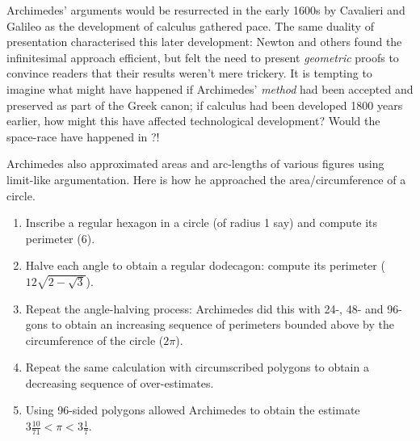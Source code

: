 Archimedes' arguments would be resurrected in the early 1600s by Cavalieri and Galileo as the development of calculus gathered pace. The same duality of presentation characterised this later development: Newton and others found the infinitesimal approach efficient, but felt the need to present \emph{geometric} proofs to convince readers that their results weren't mere trickery.\smallbreak
It is tempting to imagine what might have happened if Archimedes' \emph{method} had been accepted and preserved as part of the Greek canon; if calculus had been developed 1800 years earlier, how might this have affected technological development? Would the space-race have happened in ?! %


 Archimedes also approximated areas and arc-lengths of various figures using limit-like argumentation. Here is how he approached the area/circumference of a circle.\label{pg:archquadcircle}

\begin{enumerate}\itemsep0pt
  \item Inscribe a regular hexagon in a circle (of radius 1 say) and compute its perimeter ($6$).
  \item Halve each angle to obtain a regular dodecagon: compute its perimeter ($12\sqrt{2-\sqrt 3}$).
  \item Repeat the angle-halving process: Archimedes did this with 24-, 48- and 96-gons to obtain an increasing sequence of perimeters bounded above by the circumference of the circle ($2\pi$).
  \item Repeat the same calculation with circumscribed polygons to obtain a decreasing sequence of over-estimates.
  \item Using 96-sided polygons allowed Archimedes to obtain the estimate $3\frac{10}{71}<\pi<3\frac 17$.
\end{enumerate}

